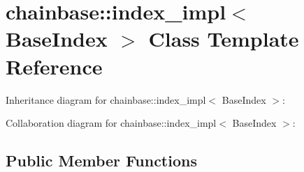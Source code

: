 \hypertarget{classchainbase_1_1index__impl}{}\section{chainbase\+:\+:index\+\_\+impl$<$ Base\+Index $>$ Class Template Reference}
\label{classchainbase_1_1index__impl}


Inheritance diagram for chainbase\+:\+:index\+\_\+impl$<$ Base\+Index $>$\+:


Collaboration diagram for chainbase\+:\+:index\+\_\+impl$<$ Base\+Index $>$\+:
\subsection*{Public Member Functions}
